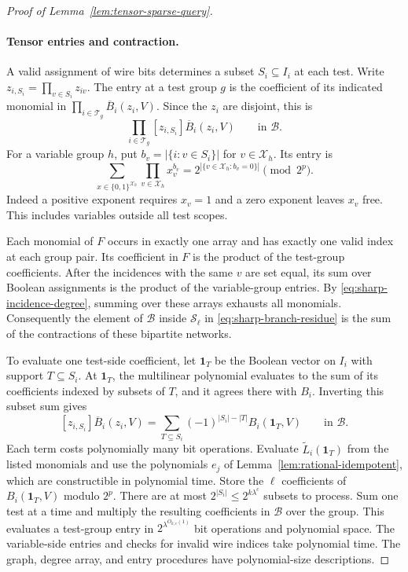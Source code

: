 \begin{proof}[Proof of Lemma~\ref{lem:tensor-sparse-query}]
\paragraph{Tensor entries and contraction.}
A valid assignment of wire bits determines a subset $S_i\subseteq I_i$
at each test. Write $z_{i,S_i}=\prod_{v\in S_i}z_{iv}$. The entry
at a test group $g$ is the coefficient of its indicated monomial
in $\prod_{i\in\mathcal T_g}\overline B_i(z_i,V)$. Since the $z_i$
are disjoint, this is
\[
 \prod_{i\in\mathcal T_g}[z_{i,S_i}]\overline B_i(z_i,V)
 \qquad\text{in }\mathcal B.
\]
For a variable group $h$, put $b_v=|\{i:v\in S_i\}|$
for $v\in\mathcal X_h$. Its entry is
\[
 \sum_{x\in\{0,1\}^{\mathcal X_h}}
        \prod_{v\in\mathcal X_h}x_v^{b_v}
   =2^{|\{v\in\mathcal X_h:b_v=0\}|}\pmod{2^p}.
\]
Indeed a positive exponent requires $x_v=1$ and a zero exponent
leaves $x_v$ free. This includes variables outside all test scopes.

Each monomial of $F$ occurs in exactly one array and has exactly
one valid index at each group pair. Its coefficient in $F$ is the
product of the test-group coefficients. After the incidences with
the same $v$ are set equal, its sum over Boolean assignments is
the product of the variable-group entries. By
\eqref{eq:sharp-incidence-degree}, summing over these arrays exhausts
all monomials. Consequently the element of $\mathcal B$ inside
$\mathcal S_\ell$ in \eqref{eq:sharp-branch-residue} is the sum of
the contractions of these bipartite networks.

To evaluate one test-side coefficient, let $\mathbf1_T$ be the
Boolean vector on $I_i$ with support $T\subseteq S_i$. At
$\mathbf1_T$, the multilinear polynomial evaluates to the sum of its
coefficients indexed by subsets of $T$, and it agrees there with
$B_i$. Inverting this subset sum gives
\[
 [z_{i,S_i}]\overline B_i(z_i,V)=
 \sum_{T\subseteq S_i}(-1)^{|S_i|-|T|}B_i(\mathbf1_T,V)
 \qquad\text{in }\mathcal B.
\]
Each term costs polynomially many bit operations. Evaluate
$\widetilde L_i(\mathbf1_T)$ from the listed monomials and use the
polynomials $e_j$ of Lemma~\ref{lem:rational-idempotent}, which
are constructible in polynomial time. Store the $\ell$ coefficients
of $B_i(\mathbf1_T,V)$ modulo $2^p$. There are at most
$2^{|S_i|}\le 2^{k\lambda^c}$ subsets to process. Sum one test
at a time and multiply the resulting coefficients in $\mathcal B$
over the group. This evaluates a test-group entry in
$2^{\lambda^{O_{k,c}(1)}}$ bit operations and polynomial space.
The variable-side entries and checks for invalid wire indices take
polynomial time. The graph, degree array, and entry procedures have
polynomial-size descriptions.


\end{proof}
